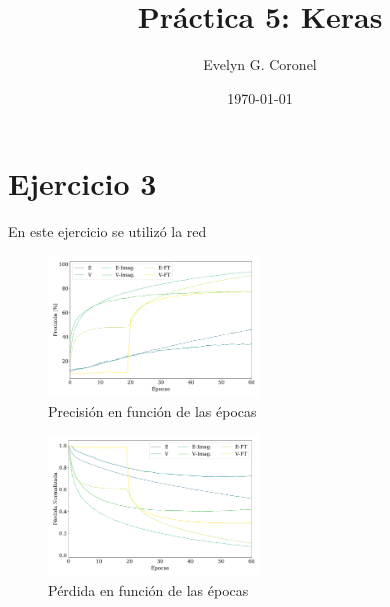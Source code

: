 
\usepackage{multirow}


\title{Práctica 5: Keras}
\author{Evelyn G. Coronel}


\date[]{\lowercase{\today}} 

\maketitle

\section*{Ejercicio 3}

En este ejercicio se utilizó la red \verbMobileNet

\begin{figure}
    \begin{small}
        \begin{center}
            \includegraphics[width=0.5\textwidth]{Figs/ejer3_acc.pdf}
        \end{center}
        \caption{Precisión en función de las épocas}
        \label{fig:ejer3_acc}
    \end{small}
\end{figure}



\begin{figure}
    \begin{small}
        \begin{center}
            \includegraphics[width=0.5\textwidth]{Figs/ejer3_loss.pdf}
        \end{center}
        \caption{Pérdida en función de las épocas}
        \label{fig:ejer3_acc}
    \end{small}
\end{figure}




